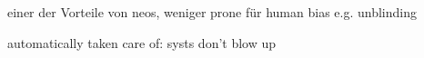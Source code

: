 einer der Vorteile von neos, weniger prone für human bias e.g. unblinding

automatically taken care of: systs don't blow up 